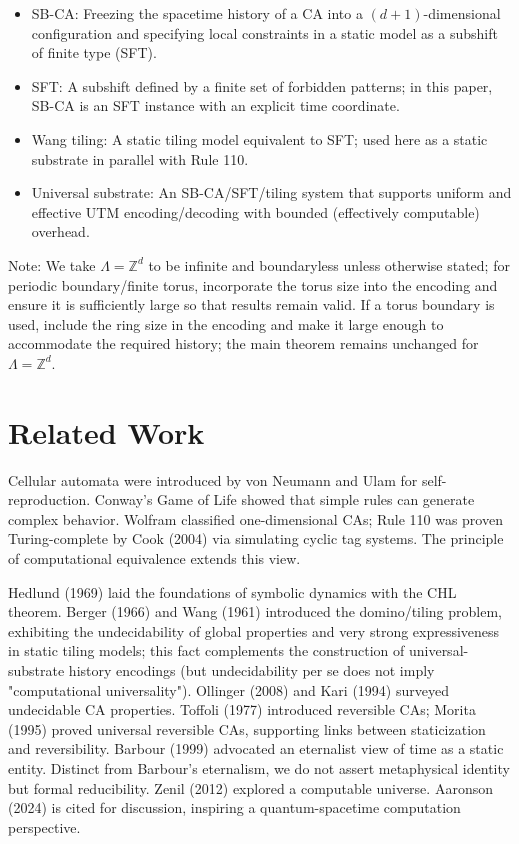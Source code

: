 \documentclass[12pt]{article}
\theoremstyle{plain}
\theoremstyle{definition}
\begin{document}
\begin{itemize}
\item SB-CA: Freezing the spacetime history of a CA into a $(d+1)$-dimensional configuration and specifying local constraints in a static model as a subshift of finite type (SFT).
\item SFT: A subshift defined by a finite set of forbidden patterns; in this paper, SB-CA is an SFT instance with an explicit time coordinate.
\item Wang tiling: A static tiling model equivalent to SFT; used here as a static substrate in parallel with Rule 110.
\item Universal substrate: An SB-CA/SFT/tiling system that supports uniform and effective UTM encoding/decoding with bounded (effectively computable) overhead.
\end{itemize}

Note: We take $\Lambda=\mathbb{Z}^d$ to be infinite and boundaryless unless otherwise stated; for periodic boundary/finite torus, incorporate the torus size into the encoding and ensure it is sufficiently large so that results remain valid. If a torus boundary is used, include the ring size in the encoding and make it large enough to accommodate the required history; the main theorem remains unchanged for $\Lambda=\mathbb{Z}^d$.

\section{Related Work}

Cellular automata were introduced by von Neumann and Ulam for self-reproduction. Conway's Game of Life showed that simple rules can generate complex behavior. Wolfram\cite{wolfram2002} classified one-dimensional CAs; Rule 110 was proven Turing-complete by Cook (2004)\cite{cook2004} via simulating cyclic tag systems. The principle of computational equivalence extends this view.

Hedlund (1969)\cite{hedlund1969} laid the foundations of symbolic dynamics with the CHL theorem. Berger (1966)\cite{berger1966} and Wang (1961)\cite{wang1961} introduced the domino/tiling problem, exhibiting the undecidability of global properties and very strong expressiveness in static tiling models; this fact complements the construction of universal-substrate history encodings (but undecidability per se does not imply "computational universality"). Ollinger (2008)\cite{ollinger2008} and Kari (1994)\cite{kari1994} surveyed undecidable CA properties. Toffoli (1977)\cite{toffoli1977} introduced reversible CAs; Morita (1995)\cite{morita1995} proved universal reversible CAs, supporting links between staticization and reversibility. Barbour (1999)\cite{barbour1999} advocated an eternalist view of time as a static entity. Distinct from Barbour's eternalism, we do not assert metaphysical identity but formal reducibility. Zenil (2012)\cite{zenil2012} explored a computable universe. Aaronson (2024)\cite{aaronson2024} is cited for discussion, inspiring a quantum-spacetime computation perspective.
\end{document}
